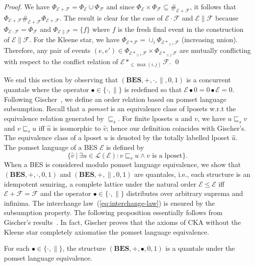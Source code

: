 \documentclass{llncs}
\newcommand{\BES}{\mathbf{BES}}
\renewcommand{\L}{\mathcal{L}}
\newcommand{\EE}{\mathcal{E}}
\newcommand{\FF}{\mathcal{F}}
\newcommand{\refby}{\sqsubseteq}
\newcommand{\<}{\langle}
\renewcommand{\>}{\rangle}
\newcommand{\exit}{\Phi}
\begin{document}
\begin{proof}
We have $\exit_{\EE+\FF} = \exit_{\EE}\cup\exit_{\FF}$ and since $\exit_{\EE}\times\exit_{\FF}\subseteq\#_{\EE+\FF}$, it follows that $\exit_{\EE+\FF}\#_{\EE+\FF}\exit_{\EE+\FF}$. The result is clear for the case of $\EE\cdot\FF$ and $\EE\|\FF$ because $\exit_{\EE\cdot\FF}= \exit_\FF$ and $\exit_{\EE\|\FF} = \{f\}$ where $f$ is the fresh final event in the construction of $\EE\|\FF$. For the Kleene star, we have $\exit_{\EE*\FF} = \cup_i\exit_{\EE*_{\le i}\FF}$ (increasing union). Therefore, any pair of events  $(e,e')\in\exit_{\EE*_{\le i}\FF}\times\exit_{\EE*_{\le j}\FF}$ are mutually conflicting with respect to the conflict relation of $\EE*_{\le \max(i,j)}\FF$. 
\qed
\end{proof}

We end this section by observing that $(\BES,+,\cdot,\|,0,1)$ is a concurrent quantale where the operator $\bullet\in\{\cdot,\|\}$ is redefined so that $\EE\bullet 0 = 0\bullet \EE = 0$. Following Gischer~\cite{Gis88}, we define an order relation based on pomset language subsumption. Recall that a \emph{pomset} is an equivalence class of lposets w.r.t the equivalence relation generated by $\refby_s$. For finite lposets $u$ and $v$, we have $u\refby_s v$ and $v\refby_s u$ iff $\hat u$ is isomorphic to $\hat v$; hence our definition coincides with Gischer's. The equivalence class of a lposet $u$ is denoted by the totally labelled lposet $\hat u$. The pomset language of a BES $\EE$ is defined  by 
$$\{\hat v\ |\ \exists u\in\L(\EE):v\refby_s u\wedge v\textrm{ is a lposet}\}.$$ 
When a BES is considered modulo pomset language equivalence, we show that $(\BES,+,\cdot,0,1)$ and $(\BES,+,\|,0,1)$ are quantales, 
i.e., each structure is an idempotent
semiring, a complete lattice
under the natural order $\EE\leq \EE$ iff $\EE+\FF = \FF$ and 
the operator $\bullet\in\{\cdot,\|\}$ distributes over arbitrary suprema and infinima. The interchange law~(\ref{eq:interchange-law}) is ensured by the subsumption property. The following proposition essentially follows from Gischer's results~\cite{Gis88}. In fact, Gischer proves that the axioms of CKA without the Kleene star completely axiomatise the pomset language equivalence.

\begin{proposition}\label{pro:cka}
For each $\bullet\in\{\cdot,\|\}$, the structure $(\BES,+,\bullet,0,1)$ is a quantale under the pomset language equivalence.
\end{proposition}
\end{document}
